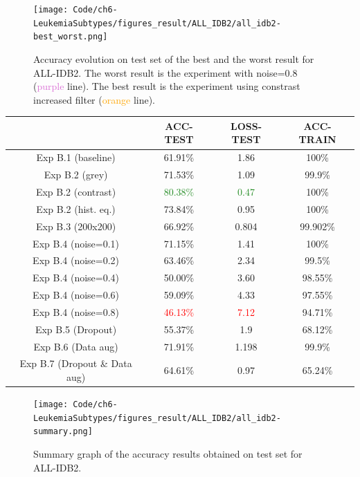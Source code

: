 \documentclass[11pt, openany]{report}
\theoremstyle{plain}
\theoremstyle{definition}
\theoremstyle{remark}
\begin{document}
\begin{center}

\begin{figure}[H]
  \centering
  \texttt{[image: Code/ch6-LeukemiaSubtypes/figures\_result/ALL\_IDB2/all\_idb2-best\_worst.png]}
  \caption{Accuracy evolution on test set of the best and the worst result for ALL-IDB2. The worst result is the experiment with noise=0.8 (\textcolor{Orchid}{purple} line). The best result is the experiment using constrast increased filter (\textcolor{orange}{orange} line).}
  \label{fig:all_idb2-best_worst}
\end{figure}


\begin{tabular}{|c|c|c|c|}
  \hline
          & \textbf{ACC-TEST} & \textbf{LOSS-TEST} & \textbf{ACC-TRAIN} \\
  \hline
  Exp B.1 (baseline) & 61.91\% & 1.86 & 100\% \\
  \hline
  Exp B.2 (grey) & 71.53\% & 1.09 & 99.9\%  \\ 
  Exp B.2 (contrast) & \textcolor{ForestGreen}{80.38\%} & \textcolor{ForestGreen}{0.47} & 100\% \\ 
  Exp B.2 (hist. eq.) & 73.84\% & 0.95 & 100\% \\ 
  \hline
  Exp B.3 (200x200) & 66.92\% & 0.804 & 99.902\% \\
  \hline
  Exp B.4 (noise=0.1) & 71.15\% & 1.41 & 100\%  \\ 
  Exp B.4 (noise=0.2) & 63.46\% & 2.34 & 99.5\% \\ 
  Exp B.4 (noise=0.4) & 50.00\% & 3.60 & 98.55\% \\
  Exp B.4 (noise=0.6) & 59.09\% & 4.33 & 97.55\%  \\ 
  Exp B.4 (noise=0.8) & \textcolor{red}{46.13\%} & \textcolor{red}{7.12} & 94.71\% \\
  \hline 
  Exp B.5 (Dropout) & 55.37\% & 1.9 & 68.12\% \\
  \hline
  Exp B.6 (Data aug) & 71.91\% & 1.198 & 99.9\% \\
  \hline
  Exp B.7 (Dropout \& Data aug) & 64.61\% & 0.97 & 65.24\% \\ 
  \hline
\end{tabular}
\label{table:summary-allidb2}

\begin{figure}[H]
  \centering
  \texttt{[image: Code/ch6-LeukemiaSubtypes/figures\_result/ALL\_IDB2/all\_idb2-summary.png]}
  \caption{Summary graph of the accuracy results obtained on test set for ALL-IDB2.}
  \label{fig:summary_res_ALL-IDB2}
\end{figure}

\end{center}
\end{document}
